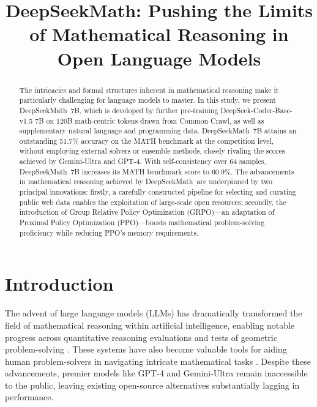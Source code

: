 \title{DeepSeekMath: Pushing the Limits of Mathematical Reasoning in Open Language Models}

\begin{abstract}
The intricacies and formal structures inherent in mathematical reasoning make it particularly challenging for language models to master. In this study, we present DeepSeekMath~7B, which is developed by further pre-training DeepSeek-Coder-Base-v1.5 7B on 120B math-centric tokens drawn from Common Crawl, as well as supplementary natural language and programming data. DeepSeekMath~7B attains an outstanding 51.7\% accuracy on the MATH benchmark at the competition level, without employing external solvers or ensemble methods, closely rivaling the scores achieved by Gemini-Ultra and GPT-4. With self-consistency over 64 samples, DeepSeekMath~7B increases its MATH benchmark score to 60.9\%. The advancements in mathematical reasoning achieved by DeepSeekMath~are underpinned by two principal innovations: firstly, a carefully constructed pipeline for selecting and curating public web data enables the exploitation of large-scale open resources; secondly, the introduction of Group Relative Policy Optimization (GRPO)—an adaptation of Proximal Policy Optimization (PPO)—boosts mathematical problem-solving proficiency while reducing PPO’s memory requirements.
\end{abstract}

\section{Introduction}

The advent of large language models (LLMs) has dramatically transformed the field of mathematical reasoning within artificial intelligence, enabling notable progress across quantitative reasoning evaluations \citep{MATH} and tests of geometric problem-solving \citep{trinh2024solving}. These systems have also become valuable tools for aiding human problem-solvers in navigating intricate mathematical tasks \citep{tao}. Despite these advancements, premier models like GPT-4 \citep{gpt4} and Gemini-Ultra \citep{gemini} remain inaccessible to the public, leaving existing open-source alternatives substantially lagging in performance.


